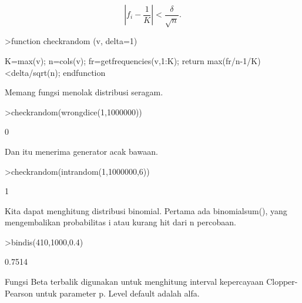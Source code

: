 \documentclass[a4paper,10pt]{article}
\begin{document}
\begin{eulernotebook}
\begin{eulercomment}
\begin{eulercomment}
\begin{eulercomment}
\begin{eulercomment}
\begin{eulercomment}
\begin{eulercomment}
\begin{eulercomment}
\begin{eulercomment}
\begin{eulercomment}
\end{eulercomment}
\begin{eulerformula}
\[
\left|f_i-\frac{1}{K}\right| < \frac{\delta}{\sqrt{n}}.
\]
\end{eulerformula}
\begin{eulerprompt}
>function checkrandom (v, delta=1) 
\end{eulerprompt}
\begin{eulerudf}
  K=max(v); n=cols(v);
  fr=getfrequencies(v,1:K);
  return max(fr/n-1/K)<delta/sqrt(n);
  endfunction 
\end{eulerudf}
\begin{eulercomment}
Memang fungsi menolak distribusi seragam.
\end{eulercomment}
\begin{eulerprompt}
>checkrandom(wrongdice(1,1000000)) 
\end{eulerprompt}
\begin{euleroutput}
  0
\end{euleroutput}
\begin{eulercomment}
Dan itu menerima generator acak bawaan.
\end{eulercomment}
\begin{eulerprompt}
>checkrandom(intrandom(1,1000000,6))
\end{eulerprompt}
\begin{euleroutput}
  1
\end{euleroutput}
\begin{eulercomment}
Kita dapat menghitung distribusi binomial. Pertama ada binomialsum(),
yang mengembalikan probabilitas i atau kurang hit dari n percobaan.
\end{eulercomment}
\begin{eulerprompt}
>bindis(410,1000,0.4)
\end{eulerprompt}
\begin{euleroutput}
  0.7514
\end{euleroutput}
\begin{eulercomment}
Fungsi Beta terbalik digunakan untuk menghitung interval kepercayaan
Clopper-Pearson untuk parameter p. Level default adalah alfa.


\end{eulercomment}
\end{eulercomment}
\end{eulercomment}
\end{eulercomment}
\end{eulercomment}
\end{eulercomment}
\end{eulercomment}
\end{eulercomment}
\end{eulercomment}
\end{eulernotebook}
\end{document}
